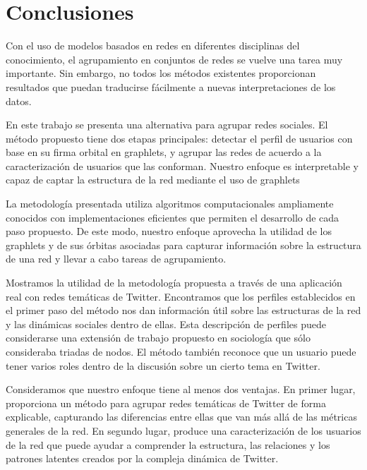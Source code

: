 
\chapter{Conclusiones}
\label{sec:conclusion}

Con el uso de modelos basados en redes en diferentes disciplinas del conocimiento, el agrupamiento en conjuntos de redes se vuelve una tarea muy importante. Sin embargo, no todos los métodos existentes proporcionan resultados que puedan traducirse fácilmente a nuevas interpretaciones de los datos. 

En este trabajo se presenta una alternativa para agrupar redes sociales. El método propuesto tiene dos etapas principales: detectar el perfil de usuarios con base en su firma orbital en graphlets, y agrupar las redes de acuerdo a la caracterización de usuarios que las conforman. Nuestro enfoque es interpretable y capaz de captar la estructura de la red mediante el uso de graphlets 

La metodología presentada utiliza algoritmos computacionales ampliamente conocidos con implementaciones eficientes que permiten el desarrollo de cada paso propuesto. De este modo, nuestro enfoque aprovecha la utilidad de los graphlets y de sus órbitas asociadas para capturar información sobre la estructura de una red y llevar a cabo tareas de agrupamiento.
 
Mostramos la utilidad de la metodología propuesta a través de una aplicación real con redes temáticas de Twitter. Encontramos que los perfiles establecidos en el primer paso del método nos dan información útil sobre las estructuras de la red y las dinámicas sociales dentro de ellas. Esta descripción de perfiles puede considerarse una extensión de trabajo propuesto en sociología que sólo consideraba triadas de nodos. El método también reconoce que un usuario puede tener varios roles dentro de la discusión sobre un cierto tema en Twitter. 

Consideramos que nuestro enfoque tiene al menos dos ventajas. En primer lugar, proporciona un método para agrupar redes temáticas de Twitter de forma explicable, capturando las diferencias entre ellas que van más allá de las métricas generales de la red. En segundo lugar, produce una caracterización de los usuarios de la red que puede ayudar a comprender la estructura, las relaciones y los patrones latentes creados por la compleja dinámica de Twitter. 


